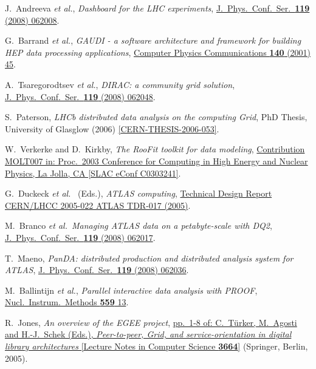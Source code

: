 \documentclass{elsart}
\def\etal {\textit{et al.}}
\begin{document}
\begin{thebibliography}{00}
 J.~Andreeva \etal,
\textit{Dashboard for the LHC experiments},
\href{http://dx.doi.org/10.1088/1742-6596/119/6/062008}
{J.\ Phys.\ Conf.\ Ser.\ \textbf{119} (2008) 062008}.

 G.~Barrand \etal,
\textit{GAUDI - a software architecture and framework for building HEP
data processing applications},
\href{http://dx.doi.org/10.1016/S0010-4655(01)00254-5}
{Computer Physics Communications \textbf{140} (2001) 45}.

 A.~Tsaregorodtsev \etal,
\textit{DIRAC: a community grid solution},
\href{http://dx.doi.org/10.1088/1742-6596/119/6/062048}
{J.\ Phys.\ Conf.\ Ser.\ \textbf{119} (2008) 062048}.

 S.~Paterson,
\textit{LHCb distributed data analysis on the computing Grid},
PhD Thesis, University of Glasglow (2006)
\href{http://cdsweb.cern.ch/record/995676/}
{[CERN-THESIS-2006-053]}.

 W.~Verkerke and D.~Kirkby,
\textit{The RooFit toolkit for data modeling},
\href{http://www.slac.stanford.edu/econf/C0303241/proc/papers/MOLT007.PDF}
{Contribution MOLT007 in:
Proc.\ 2003 Conference for Computing in High Energy and Nuclear Physics,
La Jolla, CA [SLAC eConf C0303241]}.

 G.~Duckeck \etal~ (Eds.),
\textit{ATLAS computing},
\href{http://cdsweb.cern.ch/record/837738}
{Technical Design Report CERN/LHCC 2005-022 ATLAS TDR-017 (2005)}.

 M.~Branco \etal\,
\textit{Managing ATLAS data on a petabyte-scale with DQ2},
\href{http://dx.doi.org/10.1088/1742-6596/119/6/062017}
{J.~Phys.\ Conf.\ Ser.\ \textbf{119} (2008) 062017}.

 T.~Maeno,
\textit{PanDA: distributed production and distributed analysis system for
ATLAS},
\href{http://dx.doi.org/10.1088/1742-6596/119/6/062036}
{J.~Phys.\ Conf.\ Ser.\ \textbf{119} (2008) 062036}.

 M.~Ballintijn \etal,
\textit{Parallel interactive data analysis with PROOF},
\href{http://dx.doi.org/10.1016/j.nima.2005.11.100}
{Nucl.\ Instrum.\ Methods \textbf{559} 13}.

 R.~Jones,
\textit{An overview of the EGEE project},
\href{http://dx.doi.org/10.1007/11549819}
{pp.~1-8 of: C.~T\"urker, M.~Agosti and H.-J.~Schek (Eds.),
\textit{Peer-to-peer, Grid, and service-orientation in digital library
architectures}
[Lecture Notes in Computer Science \textbf{3664}]} (Springer, Berlin, 2005).


\end{thebibliography}
\end{document}

